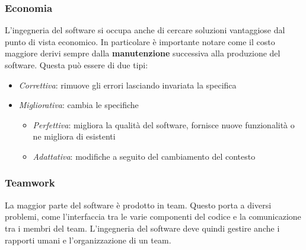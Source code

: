 \subsubsection{Economia}
L'ingegneria del software si occupa anche di cercare soluzioni vantaggiose dal punto di vista economico. In particolare è importante notare come il costo maggiore derivi sempre dalla \textbf{manutenzione} successiva alla produzione del software. Questa può essere di due tipi:
\begin{itemize}
	\item \textit{Correttiva}: rimuove gli errori lasciando invariata la specifica
	\item \textit{Migliorativa}: cambia le specifiche
	\begin{itemize}
		\item \textit{Perfettiva}: migliora la qualità del software, fornisce nuove funzionalità o ne migliora di esistenti
		\item \textit{Adattativa}: modifiche a seguito del cambiamento del contesto
	\end{itemize}
\end{itemize}
\subsubsection{Teamwork}
La maggior parte del software è prodotto in team. Questo porta a diversi problemi, come l'interfaccia tra le varie componenti del codice e la comunicazione tra i membri del team. L'ingegneria del software deve quindi gestire anche i rapporti umani e l'organizzazione di un team.